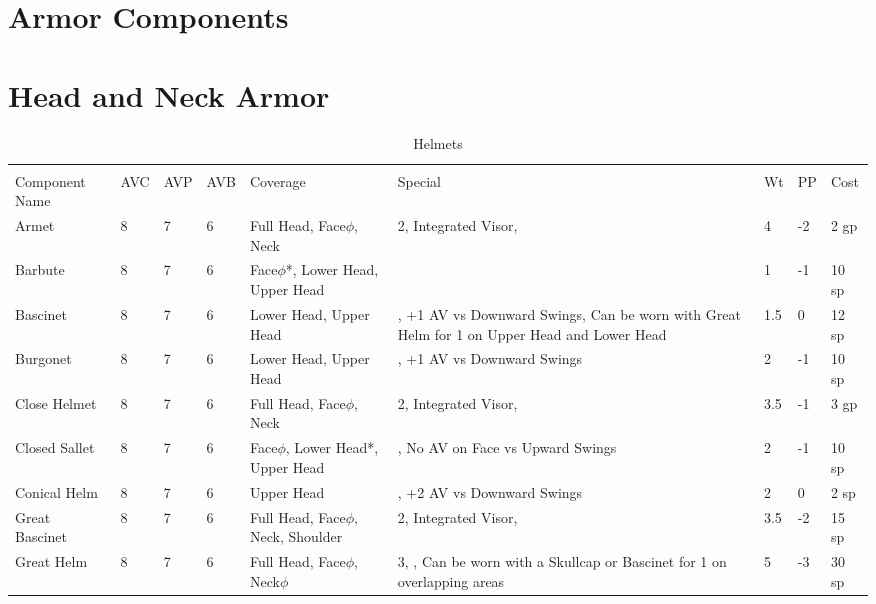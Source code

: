 \documentclass[oneside,11pt,english]{book}
\begin{document}
\section*{Armor Components}
\section{Head and Neck Armor}\label{sec:Head and Neck Armor}
\begin{longtabu}to 
  \captionsetup{textformat=empty, labelformat=blank}
  \caption{Helmets} \vspace{-15pt}
  \label{tab:Helmets}\\
  Component Name&AVC&AVP&AVB& Coverage& Special& Wt&PP& Cost\\\toprule
  Armet& 8& 7& 6& Full Head, Face\hyperref[sec:Weak Spots]{$\phi$}, Neck & 2, Integrated Visor, & 4& -2& 2 gp\\
  Barbute& 8& 7& 6& Face\hyperref[sec:Weak Spots]{$\phi$}*, Lower Head, Upper Head && 1 &-1& 10 sp\\
  Bascinet& 8& 7& 6& Lower Head, Upper Head &, +1 AV vs Downward Swings, Can be worn with Great Helm for  1 on Upper Head and Lower Head& 1.5& 0& 12 sp\\
  Burgonet& 8& 7& 6& Lower Head, Upper Head &, +1 AV vs Downward Swings &2 &-1& 10 sp\\
  Close Helmet& 8& 7& 6& Full Head, Face\hyperref[sec:Weak Spots]{$\phi$}, Neck & 2, Integrated Visor, & 3.5 &-1& 3 gp\\
  Closed Sallet& 8& 7& 6& Face\hyperref[sec:Weak Spots]{$\phi$}, Lower Head*, Upper Head &, No AV on Face vs Upward Swings &2 &-1& 10 sp\\
  Conical Helm& 8& 7& 6& Upper Head &, +2 AV vs Downward Swings&2& 0&2 sp \\
  Great Bascinet& 8& 7& 6& Full Head, Face\hyperref[sec:Weak Spots]{$\phi$}, Neck, Shoulder & 2, Integrated Visor, & 3.5 &-2& 15 sp\\
  Great Helm& 8& 7& 6& Full Head, Face\hyperref[sec:Weak Spots]{$\phi$}, Neck\hyperref[sec:Weak Spots]{$\phi$} & 3, , Can be worn with a Skullcap or Bascinet for  1 on overlapping areas& 5 &-3& 30 sp\\

\end{longtabu}
\end{document}
